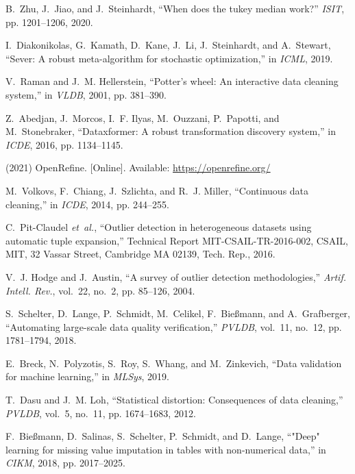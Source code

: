 \documentclass[11pt,dvipsnames]{article}
\begin{document}
\begin{thebibliography}{10}
B.~Zhu, J.~Jiao, and J.~Steinhardt, ``When does the tukey median work?''
  \emph{ISIT}, pp. 1201--1206, 2020.

I.~Diakonikolas, G.~Kamath, D.~Kane, J.~Li, J.~Steinhardt, and A.~Stewart,
  ``Sever: A robust meta-algorithm for stochastic optimization,'' in
  \emph{ICML}, 2019.

V.~Raman and J.~M. Hellerstein, ``Potter's wheel: An interactive data cleaning
  system,'' in \emph{VLDB}, 2001, pp. 381--390.

Z.~Abedjan, J.~Morcos, I.~F. Ilyas, M.~Ouzzani, P.~Papotti, and M.~Stonebraker,
  ``Dataxformer: {A} robust transformation discovery system,'' in \emph{ICDE},
  2016, pp. 1134--1145.

\BIBentryALTinterwordspacing
(2021) Open{R}efine. [Online]. Available: \url{https://openrefine.org/}
\BIBentrySTDinterwordspacing

M.~Volkovs, F.~Chiang, J.~Szlichta, and R.~J. Miller, ``Continuous data
  cleaning,'' in \emph{ICDE}, 2014, pp. 244--255.

C.~Pit-Claudel \emph{et~al.}, ``Outlier detection in heterogeneous datasets
  using automatic tuple expansion,'' Technical Report MIT-CSAIL-TR-2016-002,
  CSAIL, MIT, 32 Vassar Street, Cambridge MA 02139, Tech. Rep., 2016.

V.~J. Hodge and J.~Austin, ``A survey of outlier detection methodologies,''
  \emph{Artif. Intell. Rev.}, vol.~22, no.~2, pp. 85--126, 2004.

S.~Schelter, D.~Lange, P.~Schmidt, M.~Celikel, F.~Bie{\ss}mann, and
  A.~Grafberger, ``Automating large-scale data quality verification,''
  \emph{{PVLDB}}, vol.~11, no.~12, pp. 1781--1794, 2018.

E.~Breck, N.~Polyzotis, S.~Roy, S.~Whang, and M.~Zinkevich, ``Data validation
  for machine learning,'' in \emph{MLSys}, 2019.

T.~Dasu and J.~M. Loh, ``Statistical distortion: Consequences of data
  cleaning,'' \emph{PVLDB}, vol.~5, no.~11, pp. 1674--1683, 2012.

F.~Bie{\ss}mann, D.~Salinas, S.~Schelter, P.~Schmidt, and D.~Lange, ``"{D}eep"
  learning for missing value imputation in tables with non-numerical data,'' in
  \emph{CIKM}, 2018, pp. 2017--2025.


\end{thebibliography}
\end{document}
